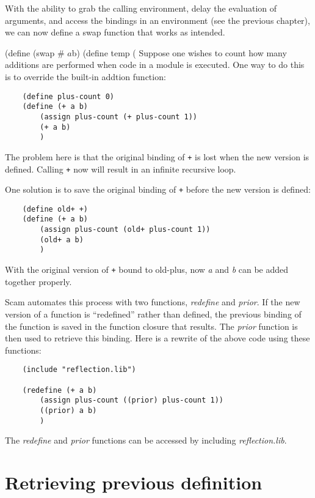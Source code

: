With the ability to grab the calling environment,
delay the evaluation of arguments, and access the
bindings in an environment (see the previous chapter),
we can now define a swap function that works as intended.

    (define (swap # $a $b)
        (define temp (
Suppose one wishes to count how many additions are performed when
code in a module is executed. One way to do this is to override
the built-in addtion function:

\begin{verbatim}
    (define plus-count 0)
    (define (+ a b)
        (assign plus-count (+ plus-count 1))
        (+ a b)
        )
\end{verbatim}

The problem here is that the original binding of \verb!+! is lost when the 
new version is defined.
Calling \verb!+! now will result in an infinite recursive
loop.

One solution is to save the original binding of \verb!+! before the new version
is defined:

\begin{verbatim}
    (define old+ +)
    (define (+ a b)
        (assign plus-count (old+ plus-count 1))
        (old+ a b)
        )
\end{verbatim}

With the original version of \verb!+! bound to old-plus,
now {\it a} and {\it b} can be added
together properly.
    
Scam automates this process with two functions, {\it redefine} and {\it prior}.
If the new version of a function is ``redefined'' rather than defined,
the previous
binding of the function is saved in the function closure that results.
The {\it prior} function 
is then used to retrieve this binding. Here is a rewrite
of the above code using these functions:

\begin{verbatim}
    (include "reflection.lib")

    (redefine (+ a b)
        (assign plus-count ((prior) plus-count 1))
        ((prior) a b)
        )
\end{verbatim}

The {\it redefine} and {\it prior} functions can be accessed by including
{\it reflection.lib}.
    
\section{Retrieving previous definition}

